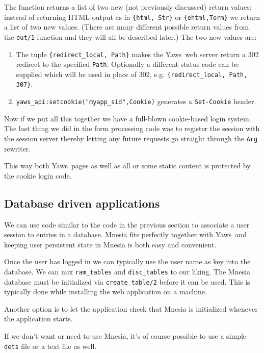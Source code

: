 \documentclass[11pt,oneside,english]{book}
\newcommand{\Yaws}            %
        {{\sc Yaws}}
\begin{document}
The function returns a list of two new (not previously discussed)
return values: instead of returning HTML output as in
\verb+{html, Str}+ or \verb+{ehtml,Term}+ we return a list of two new
values. (There are many different possible return values from the
\verb+out/1+ function and they will all be described later.) The two
new values are:

\begin{enumerate}

\item The tuple \verb+{redirect_local, Path}+ makes the \Yaws\ web
  server return a 302 redirect to the specified \verb+Path+.
  Optionally a different status code can be supplied which will be
  used in place of 302, e.g.  \verb+{redirect_local, Path, 307}+.

\item \verb+yaws_api:setcookie("myapp_sid",Cookie)+ generates a
  \verb+Set-Cookie+ header.
\end{enumerate}

Now if we put all this together we have a full-blown cookie-based
login system. The last thing we did in the form processing code was
to register the session with the session server thereby letting any
future requests go straight through the \verb+Arg+ rewriter.

This way both \Yaws\  pages as well as all or some static content
is protected by the cookie login code.

\subsection{Database driven applications}

We can use code similar to the code in the previous section to associate
a user session to entries in a database. Mnesia fits perfectly
together with \Yaws\  and keeping user persistent state in Mnesia is
both easy and convenient.

Once the user has logged in we can typically use the user name as key
into the database. We can mix \verb+ram_tables+ and \verb+disc_tables+
to our liking. The Mnesia database must be initialized via
\verb+create_table/2+ before it can be used. This is typically done
while installing the web application on a machine.

Another option is to let the application check that Mnesia
is initialized whenever the application starts.

If we don't want or need to use Mnesia, it's of course possible
to use a simple \verb+dets+ file or a text file as well.
\end{document}
